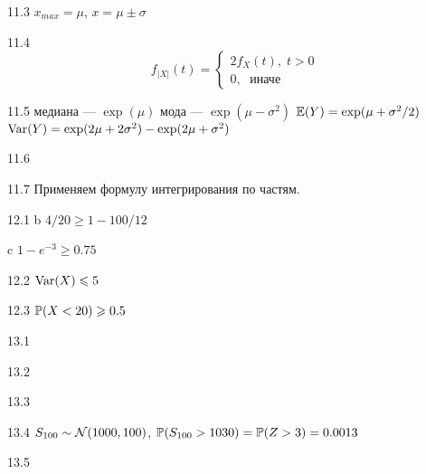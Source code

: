 \protect \hypertarget {soln:11.3}{}
\begin{solution}{{11.3}}
$x_{max}=\mu$, $x=\mu \pm \sigma$
\end{solution}
\protect \hypertarget {soln:11.4}{}
\begin{solution}{{11.4}}
  \[
  f_{|X|}(t) =
  \begin{cases}
  2f_X(t), \; t>0 \\
  0, \; \text{ иначе }
  \end{cases}
  \]
\end{solution}
\protect \hypertarget {soln:11.5}{}
\begin{solution}{{11.5}}
  медиана — $\exp(\mu)$
  мода — $\exp(\mu - \sigma^2)$
  $\E(Y)=\exp(\mu+\sigma^2/2)$
  $\Var(Y)=\exp(2\mu + 2\sigma^2)-\exp(2\mu + \sigma^2)$

\end{solution}
\protect \hypertarget {soln:11.6}{}
\begin{solution}{{11.6}}
\end{solution}
\protect \hypertarget {soln:11.7}{}
\begin{solution}{{11.7}}
  Применяем формулу интегрирования по частям.
\end{solution}
\protect \hypertarget {soln:12.1}{}
\begin{solution}{{12.1}}
  b $4/20\geq 1-100/12$

  c $1-e^{-3}\geq 0.75$
\end{solution}
\protect \hypertarget {soln:12.2}{}
\begin{solution}{{12.2}}
  $\Var(X)\leq 5$
\end{solution}
\protect \hypertarget {soln:12.3}{}
\begin{solution}{{12.3}}
  $\P(X<20) \geq 0.5$
\end{solution}
\protect \hypertarget {soln:13.1}{}
\begin{solution}{{13.1}}
\end{solution}
\protect \hypertarget {soln:13.2}{}
\begin{solution}{{13.2}}
\end{solution}
\protect \hypertarget {soln:13.3}{}
\begin{solution}{{13.3}}
\end{solution}
\protect \hypertarget {soln:13.4}{}
\begin{solution}{{13.4}}
  $S_{100} \sim \cN(1000, 100)$, $\P(S_{100}>1030)=\P(Z>3)=0.0013$
\end{solution}
\protect \hypertarget {soln:13.5}{}
\begin{solution}{{13.5}}
\end{solution}
